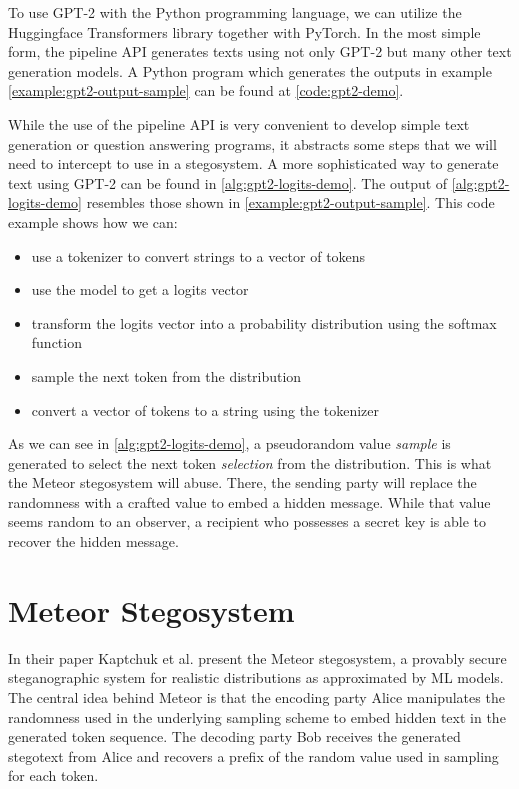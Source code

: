 To use GPT-2 with the Python programming language, we can utilize the Huggingface Transformers library together with PyTorch.
In the most simple form, the pipeline API generates texts using not only GPT-2 but many other text generation models.
A Python program which generates the outputs in example \ref{example:gpt2-output-sample} can be found at \autoref{code:gpt2-demo}.


While the use of the pipeline API is very convenient to develop simple text generation or question answering programs, it abstracts some steps that we will need to intercept to use in a stegosystem.
A more sophisticated way to generate text using GPT-2 can be found in \autoref{alg:gpt2-logits-demo}.
The output of \autoref{alg:gpt2-logits-demo} resembles those shown in \autoref{example:gpt2-output-sample}. 
This code example shows how we can:

\begin{itemize}
	\item use a tokenizer to convert strings to a vector of tokens
	\item use the model to get a logits vector
	\item transform the logits vector into a probability distribution using the softmax function
	\item sample the next token from the distribution
	\item convert a vector of tokens to a string using the tokenizer
\end{itemize}

As we can see in \autoref{alg:gpt2-logits-demo}, a pseudorandom value \emph{sample} is generated to select the next token \emph{selection} from the distribution.
This is what the Meteor stegosystem will abuse.
There, the sending party will replace the randomness with a crafted value to embed a hidden message.
While that value seems random to an observer, a recipient who possesses a secret key is able to recover the hidden message.







\section{Meteor Stegosystem}
\label{sec:meteor}
In their paper \cite{Meteor2021} Kaptchuk et al. present the Meteor stegosystem, a provably secure steganographic system for realistic distributions as approximated by ML models.
The central idea behind Meteor is that the encoding party Alice manipulates the randomness used in the underlying sampling scheme to embed hidden text in the generated token sequence.
The decoding party Bob receives the generated stegotext from Alice and recovers a prefix of the random value used in sampling for each token.


